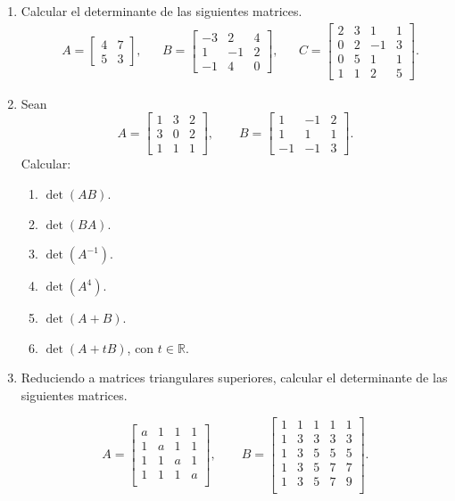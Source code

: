 \documentclass[a4paper,12pt,twoside,spanish,reqno]{amsbook}
\numberwithin{equation}{section}
\begin{document}
\begin{enumerate}[topsep=6pt,itemsep=.4cm]
\item Calcular el determinante de las siguientes matrices.
	\begin{align*}
	&A=\begin{bmatrix} 4&7\\ 5&3\end{bmatrix},
	&&B=\begin{bmatrix} -3&2&4\\ 1&-1&2\\ -1&4&0\end{bmatrix},
	&&
	C=\begin{bmatrix} 2&3&1&1\\ 0&2&-1&3 \\ 0&5&1&1 \\1&1&2&5\end{bmatrix}.
	\end{align*}


\item Sean
		$$A=
	\begin{bmatrix}
		1&3&2 \\
		3&0&2 \\
		1&1&1
	\end{bmatrix}, \qquad
	B =
	\begin{bmatrix}
		1&-1&2\\
		1&1&1 \\
		-1&-1&3
	\end{bmatrix}.
	$$
	Calcular:
	\begin{multicols}{3}
	\begin{enumerate}
		\item $\det(AB)$.
		\item $\det(BA)$.
		\item $\det(A^{-1})$.
		\item $\det(A^{4})$.
		\item $\det(A+B)$.
		\item $\det(A+tB)$, con $t \in \mathbb{R}$.
	\end{enumerate}
\end{multicols}


\item Reduciendo a matrices triangulares superiores, calcular el determinante de las siguientes matrices.

		$$A =
		\begin{bmatrix}
			a&1&1&1 \\
			1&a&1&1 \\
			1&1&a&1 \\
			1&1&1&a \\
		\end{bmatrix}, \qquad	
        B =
		\begin{bmatrix}
			1&1&1&1&1 \\
			1&3&3&3&3 \\
			1&3&5&5&5 \\
			1&3&5&7&7 \\
			1&3&5&7&9 \\
		\end{bmatrix}.
		$$


\end{enumerate}
\end{document}
